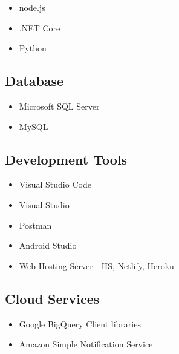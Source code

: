 \documentclass[letterpaper]{deedy-resume} %
\begin{document}
\begin{minipage}[t]{0.33\textwidth}
\begin{itemize}
\setlength\itemsep{-0.5em} %
\item node.js
\item .NET Core
\item Python
\end{itemize}

\subsection{Database}

\begin{itemize}
\setlength\itemsep{-0.5em} %
\item Microsoft SQL Server
\item MySQL
\end{itemize}

\subsection{Development Tools}

\begin{itemize}
\setlength\itemsep{-0.5em} %
\item Visual Studio Code
\item Visual Studio
\item Postman
\item Android Studio
\item Web Hosting Server - IIS, Netlify, Heroku
\end{itemize}

\subsection{Cloud Services}

\begin{itemize}
\setlength\itemsep{-0.5em} %
\item Google BigQuery Client libraries
\item Amazon Simple Notification Service
\end{itemize}







\end{minipage} %
\hfill
\end{document}
